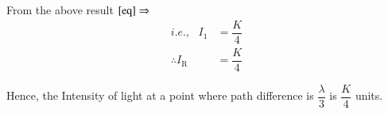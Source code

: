 \documentclass[journal,12pt,twocolumn]{IEEEtran}
\theoremstyle{remark}
\begin{document}
From the above result $ \eqref{eq} \Rightarrow$
\hspace*{0.5cm}
\begin{align}
i.e.,  \,\,\,\, I_1 &= \dfrac{K}{4} \nonumber \\
\therefore I_{\text{R}} &= \dfrac{K}{4} 
\end{align}

Hence, the Intensity of light at a point where path difference is $\dfrac{\lambda}{3}$ is $\dfrac{K}{4}$ units.


\end{document}
